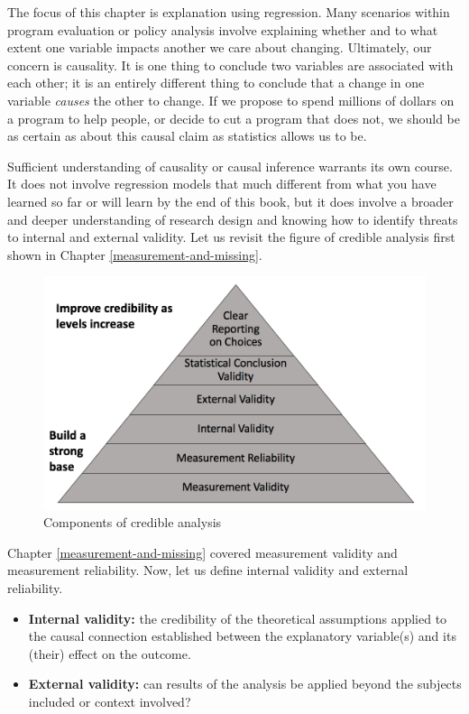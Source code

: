 \documentclass[
]{book}
\providecommand{\tightlist}{%
  \setlength{\itemsep}{0pt}\setlength{\parskip}{0pt}}
\begin{document}
The focus of this chapter is explanation using regression. Many scenarios within program evaluation or policy analysis involve explaining whether and to what extent one variable impacts another we care about changing. Ultimately, our concern is causality. It is one thing to conclude two variables are associated with each other; it is an entirely different thing to conclude that a change in one variable \emph{causes} the other to change. If we propose to spend millions of dollars on a program to help people, or decide to cut a program that does not, we should be as certain as about this causal claim as statistics allows us to be.

Sufficient understanding of causality or causal inference warrants its own course. It does not involve regression models that much different from what you have learned so far or will learn by the end of this book, but it does involve a broader and deeper understanding of research design and knowing how to identify threats to internal and external validity. Let us revisit the figure of credible analysis first shown in Chapter \ref{measurement-and-missing}.

\begin{figure}
\includegraphics[width=13.58in]{images/credible} \caption{Components of credible analysis}\label{fig:credfigrepeat}
\end{figure}

Chapter \ref{measurement-and-missing} covered measurement validity and measurement reliability. Now, let us define internal validity and external reliability.

\begin{itemize}
\tightlist
\item
  \textbf{Internal validity:} the credibility of the theoretical assumptions applied to the causal connection established between the explanatory variable(s) and its (their) effect on the outcome.
\item
  \textbf{External validity:} can results of the analysis be applied beyond the subjects included or context involved?
\end{itemize}
\end{document}
